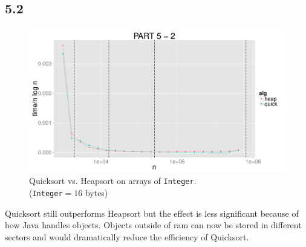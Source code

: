 \documentclass{article}
\begin{document}
\subsection*{5.2}
\begin{figure}[H]
    \centering
    \includegraphics[width=
    \textwidth]{images/part5_2.pdf}
    \caption{Quicksort vs. Heapsort on arrays of \texttt{Integer}. 
    \\(\texttt{Integer}$= 16$ bytes)}
    \label{fig:awesome_image}
\end{figure}
Quicksort still outperforms Heapsort but the effect is less significant because 
of how Java handles objects. Objects outside of ram can now be stored in 
different sectors and would dramatically reduce the efficiency of Quicksort.  

\end{document}
